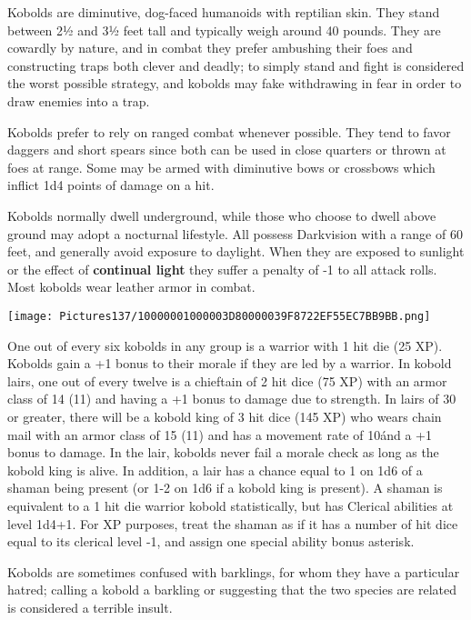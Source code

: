 \documentclass[a4paper,twoside,openany,10pt]{book}
\begin{document}
\begin{multicols}{2}
Kobolds are diminutive, dog-faced humanoids with reptilian skin. They stand between 2½ and 3½ feet tall and typically weigh around 40 pounds. They are cowardly by nature, and in combat they prefer ambushing their foes and constructing traps both clever and deadly; to simply stand and fight is considered the worst possible strategy, and kobolds may fake withdrawing in fear in order to draw enemies into a trap.

Kobolds prefer to rely on ranged combat whenever possible. They tend to favor daggers and short spears since both can be used in close quarters or thrown at foes at range. Some may be armed with diminutive bows or crossbows which inflict 1d4 points of damage on a hit. 

Kobolds normally dwell underground, while those who choose to dwell above ground may adopt a nocturnal lifestyle. All possess Darkvision with a range of 60 feet, and generally avoid exposure to daylight. When they are exposed to sunlight or the effect of \textbf{continual light }they suffer a penalty of -1 to all attack rolls. Most kobolds wear leather armor in combat.\\


\begin{center}
	 \texttt{[image: Pictures137/10000001000003D80000039F8722EF55EC7BB9BB.png]}
\end{center} \medskip

One out of every six kobolds in any group is a warrior with 1 hit die (25 XP). Kobolds gain a +1 bonus to their morale if they are led by a warrior. In kobold lairs, one out of every twelve is a chieftain of 2 hit dice (75 XP) with an armor class of 14 (11) and having a +1 bonus to damage due to strength. In lairs of 30 or greater, there will be a kobold king of 3 hit dice (145 XP) who wears chain mail with an armor class of 15 (11) and has a movement rate of 10\' and a +1 bonus to damage. In the lair, kobolds never fail a morale check as long as the kobold king is alive. In addition, a lair has a chance equal to 1 on 1d6 of a shaman being present (or 1-2 on 1d6 if a kobold king is present). A shaman is equivalent to a 1 hit die warrior kobold statistically, but has Clerical abilities at level 1d4+1. For XP purposes, treat the shaman as if it has a number of hit dice equal to its clerical level -1, and assign one special ability bonus asterisk.

Kobolds are sometimes confused with barklings, for whom they have a particular hatred; calling a kobold a barkling or suggesting that the two species are related is considered a terrible insult.



\end{multicols}
\end{document}
